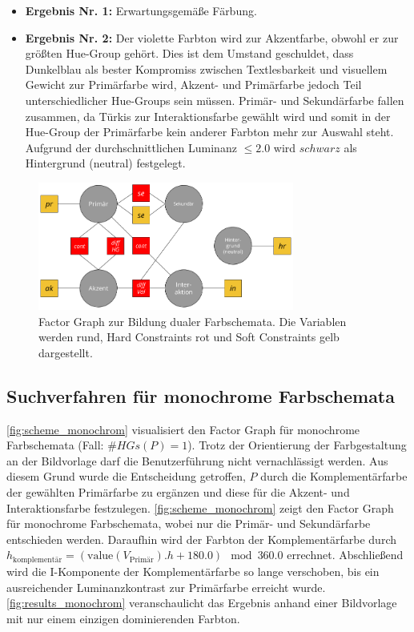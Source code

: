  \begin{itemize}
	\item \textbf{Ergebnis Nr. 1:} Erwartungsgemäße Färbung.
	\item \textbf{Ergebnis Nr. 2:} Der violette Farbton wird zur Akzentfarbe, obwohl er zur größten Hue-Group gehört. Dies ist dem Umstand geschuldet, dass Dunkelblau als bester Kompromiss zwischen Textlesbarkeit und visuellem Gewicht zur Primärfarbe wird, Akzent- und Primärfarbe jedoch Teil unterschiedlicher Hue-Groups sein müssen. Primär- und Sekundärfarbe fallen zusammen, da Türkis zur Interaktionsfarbe gewählt wird und somit in der Hue-Group der Primärfarbe kein anderer Farbton mehr zur Auswahl steht. Aufgrund der durchschnittlichen Luminanz $\leq 2.0$ wird $schwarz$ als Hintergrund (neutral) festgelegt.
\end{itemize}
 
\begin{figure}[h]
\centering
\includegraphics[width=0.75\textwidth]{img/scheme_dual.png}
\caption{Factor Graph zur Bildung dualer Farbschemata. Die Variablen werden rund, Hard Constraints rot und Soft Constraints gelb dargestellt.}
\label{fig:scheme_dual}
\end{figure}

\subsection{Suchverfahren für monochrome Farbschemata}

\autoref{fig:scheme_monochrom} visualisiert den Factor Graph für monochrome Farbschemata (Fall: $\#HGs(P) = 1$). Trotz der Orientierung der Farbgestaltung an der Bildvorlage darf die Benutzerführung nicht vernachlässigt werden. Aus diesem Grund wurde die Entscheidung getroffen, $P$ durch die Komplementärfarbe der gewählten Primärfarbe zu ergänzen und diese für die Akzent- und Interaktionsfarbe festzulegen. \autoref{fig:scheme_monochrom} zeigt den Factor Graph für monochrome Farbschemata, wobei nur die Primär- und Sekundärfarbe entschieden werden. Daraufhin wird der Farbton der Komplementärfarbe durch $h_\text{komplementär} = (\text{value}(V_\text{Primär}).h + 180.0) \mod 360.0$ errechnet. Abschließend wird die I-Komponente der Komplementärfarbe so lange verschoben, bis ein ausreichender Luminanzkontrast zur Primärfarbe erreicht wurde. \autoref{fig:results_monochrom} veranschaulicht das Ergebnis anhand einer Bildvorlage mit nur einem einzigen dominierenden Farbton.


